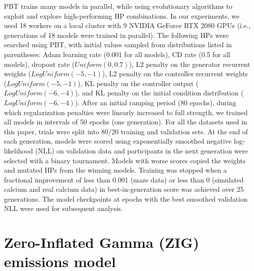 \documentclass{article}
\begin{document}
PBT trains many models in parallel, while using evolutionary algorithms to exploit and explore high-performing HP combinations. In our experiments, we used 18 workers on a local cluster with 9 NVIDIA GeForce RTX 2080 GPUs (i.e., generations of 18 models were trained in parallel). The following HPs were searched using PBT, with initial values sampled from distributions listed in parentheses: Adam learning rate (0.001 for all models), CD rate (0.5 for all models), dropout rate ($Uniform(0, 0.7)$), L2 penalty on the generator recurrent weights ($LogUniform(-5, -1)$), L2 penalty on the controller recurrent weights ($LogUniform(-5, -1)$), KL penalty on the controller output ($LogUniform(-6, -4)$), and KL penalty on the initial condition distribution ($LogUniform(-6, -4)$). After an initial ramping period (80 epochs), during which regularization penalties were linearly increased to full strength, we trained all models in intervals of 50 epochs (one generation). For all the datasets used in this paper, trials were split into 80/20 training and validation sets. At the end of each generation, models were scored using exponentially smoothed negative log-likelihood (NLL) on validation data and participants in the next generation were selected with a binary tournament. Models with worse scores copied the weights and mutated HPs from the winning models. Training was stopped when a fractional improvement of less than 0.001 (maze data) or less than 0 (simulated calcium and real calcium data) in best-in-generation score was achieved over 25 generations. The model checkpoints at epochs with the best smoothed validation NLL were used for subsequent analysis.


\section{Zero-Inflated Gamma (ZIG) emissions model}
\end{document}
